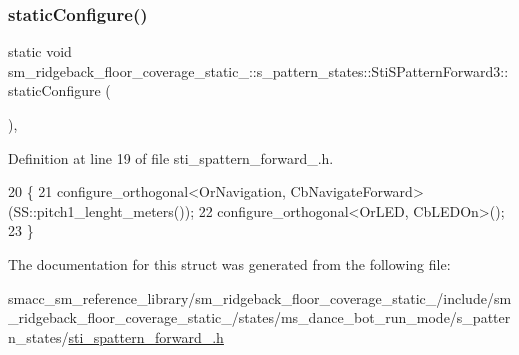 \subsubsection{\texorpdfstring{static\+Configure()}{staticConfigure()}}
{\footnotesize\ttfamily static void sm\+\_\+ridgeback\+\_\+floor\+\_\+coverage\+\_\+static\+\_\+::s\+\_\+pattern\+\_\+states\+::\+Sti\+S\+Pattern\+Forward3\+::static\+Configure (\begin{DoxyParamCaption}{ }\end{DoxyParamCaption})\hspace{0.3cm}{\ttfamily [inline]}, {\ttfamily [static]}}



Definition at line 19 of file sti\+\_\+spattern\+\_\+forward\+\_.\+h.


\begin{DoxyCode}
20   \{
21     configure\_orthogonal<OrNavigation, CbNavigateForward>(SS::pitch1\_lenght\_meters());
22     configure\_orthogonal<OrLED, CbLEDOn>();
23   \}
\end{DoxyCode}


The documentation for this struct was generated from the following file\+:\begin{DoxyCompactItemize}
\item 
smacc\+\_\+sm\+\_\+reference\+\_\+library/sm\+\_\+ridgeback\+\_\+floor\+\_\+coverage\+\_\+static\+\_/include/sm\+\_\+ridgeback\+\_\+floor\+\_\+coverage\+\_\+static\+\_/states/ms\+\_\+dance\+\_\+bot\+\_\+run\+\_\+mode/s\+\_\+pattern\+\_\+states/\hyperlink{sm__ridgeback__floor__coverage__static__1_2include_2sm__ridgeback__floor__coverage__static__1_2seb3fd39a92d554065da203aff0dcd487}{sti\+\_\+spattern\+\_\+forward\+\_.\+h}\end{DoxyCompactItemize}
